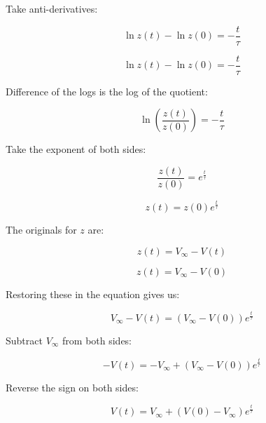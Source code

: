 \documentclass[../doc.tex]{subfiles}
\begin{document}
Take anti-derivatives:

\begin{equation}
\ln z(t) - \ln z(0)  =  - \frac{t}{\tau}
\end{equation}

\begin{equation}
\ln z(t) - \ln z(0)  =  - \frac{t}{\tau}
\end{equation}

Difference of the logs is the log of the quotient:

\begin{equation}
\ln ( \frac{z(t)}{z(0)} )  =  - \frac{t}{\tau}
\end{equation}

Take the exponent of both sides:

\begin{equation}
\frac{z(t)}{z(0)} =  e^{\frac{t}{\tau}}
\end{equation}

\begin{equation}
z(t) = z(0) e^{\frac{t}{\tau}}
\end{equation}

The originals for $z$ are:

\begin{equation}
z(t) = V_{\infty} - V(t)
\end{equation}

\begin{equation}
z(t) = V_{\infty} - V(0)
\end{equation}

Restoring these in the equation gives us:

\begin{equation}
V_{\infty} - V(t) = ( V_{\infty} - V(0) ) e^{\frac{t}{\tau}}
\end{equation}

Subtract $V_{\infty}$ from both sides: 

\begin{equation}
- V(t) = - V_{\infty} + ( V_{\infty} - V(0) ) e^{\frac{t}{\tau}}
\end{equation}

Reverse the sign on both sides:

\begin{equation}
V(t) =  V_{\infty} + ( V(0) - V_{\infty} ) e^{\frac{t}{\tau}}
\end{equation}
\end{document}
